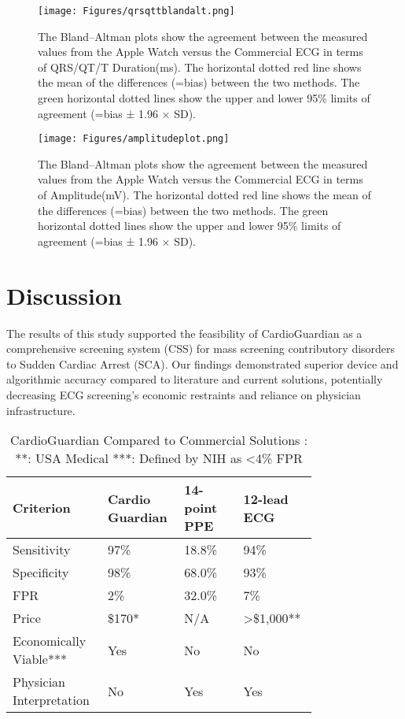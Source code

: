 \documentclass[
	a4paper, 
	10pt, 
	twoside, 
]{LTJournalArticle}
\begin{document}
\begin{figure*} [!h]
    \centering
    \texttt{[image: Figures/qrsqttblandalt.png]}
    \caption{The Bland–Altman plots show the agreement between the measured values from the Apple Watch versus the Commercial ECG in terms of QRS/QT/T Duration(ms). The horizontal dotted red line shows the mean of the differences (=bias) between the two methods. The green horizontal dotted lines show the upper and lower 95\% limits of agreement (=bias ± 1.96 × SD).}
    \label{fig:qrsqttblandalt}
\end{figure*}
\begin{figure*} [!h]
    \centering
    \texttt{[image: Figures/amplitudeplot.png]}
    \caption{The Bland–Altman plots show the agreement between the measured values from the Apple Watch versus the Commercial ECG in terms of Amplitude(mV). The horizontal dotted red line shows the mean of the differences (=bias) between the two methods. The green horizontal dotted lines show the upper and lower 95\% limits of agreement (=bias ± 1.96 × SD).}
    \label{fig:amplitude}
\end{figure*}

\clearpage


\section{Discussion}

The results of this study supported the feasibility of CardioGuardian as a comprehensive screening system (CSS) for mass screening contributory disorders to Sudden Cardiac Arrest (SCA). Our findings demonstrated superior device and algorithmic accuracy compared to literature and current solutions, potentially decreasing ECG screening's economic restraints and reliance on physician infrastructure. 

\begin{table} [!h]
	\caption{CardioGuardian Compared to Commercial Solutions \newline *: \textcite{Turner_2024} **: USA Medical \cite{USA} ***: Defined by NIH as <4\% FPR \cite{Wheeler2010}
	\label{tab:CG_comp1}}
	\centering
	\begin{tabular}{L{0.23\linewidth} L{0.18\linewidth} L{0.18\linewidth} L{0.18\linewidth}}
		\toprule
		Criterion & Cardio Guardian & 14-point PPE & 12-lead ECG \\
		\midrule
		Sensitivity & 97\% & 18.8\% & 94\% \\
        Specificity & 98\% & 68.0\% & 93\% \\
        FPR & 2\% & 32.0\% & 7\% \\
        Price & \$170* & N/A & >\$1,000** \\
        Economically Viable*** & Yes & No & No \\
        Physician Interpretation & No & Yes & Yes \\

		\bottomrule
	\end{tabular}

\end{table}
\end{document}
